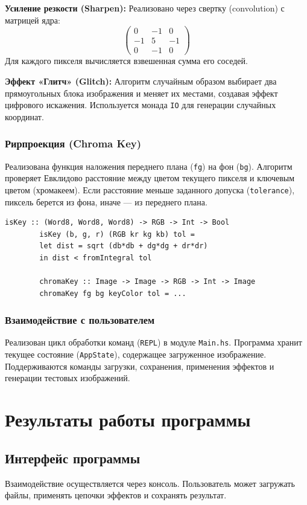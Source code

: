 \documentclass[a4paper, final]{article}
\begin{document}
	\textbf{Усиление резкости (Sharpen):}
	Реализовано через свертку (convolution) с матрицей ядра:
	$$
	\begin{pmatrix}
		0 & -1 & 0 \\
		-1 & 5 & -1 \\
		0 & -1 & 0 
	\end{pmatrix}
	$$
	Для каждого пикселя вычисляется взвешенная сумма его соседей.
	
	\textbf{Эффект «Глитч» (Glitch):}
	Алгоритм случайным образом выбирает два прямоугольных блока изображения и меняет их местами, создавая эффект цифрового искажения. Используется монада \texttt{IO} для генерации случайных координат.
	
	\subsubsection{Рирпроекция (Chroma Key)}
	Реализована функция наложения переднего плана (\texttt{fg}) на фон (\texttt{bg}).
	Алгоритм проверяет Евклидово расстояние между цветом текущего пикселя и ключевым цветом (хромакеем). Если расстояние меньше заданного допуска (\texttt{tolerance}), пиксель берется из фона, иначе — из переднего плана.
	
	\begin{lstlisting}[caption={Логика хромакея}, label={lst:chroma}]
		isKey :: (Word8, Word8, Word8) -> RGB -> Int -> Bool
		isKey (b, g, r) (RGB kr kg kb) tol =
		let dist = sqrt (db*db + dg*dg + dr*dr)
		in dist < fromIntegral tol
		
		chromaKey :: Image -> Image -> RGB -> Int -> Image
		chromaKey fg bg keyColor tol = ...

	\end{lstlisting}
	
	\subsubsection{Взаимодействие с пользователем}
	Реализован цикл обработки команд (\texttt{REPL}) в модуле \texttt{Main.hs}. Программа хранит текущее состояние (\texttt{AppState}), содержащее загруженное изображение. Поддерживаются команды загрузки, сохранения, применения эффектов и генерации тестовых изображений.
	
	\newpage
	\section {Результаты работы программы}
	\subsection{Интерфейс программы}
	Взаимодействие осуществляется через консоль. Пользователь может загружать файлы, применять цепочки эффектов и сохранять результат.
	
\end{document}
